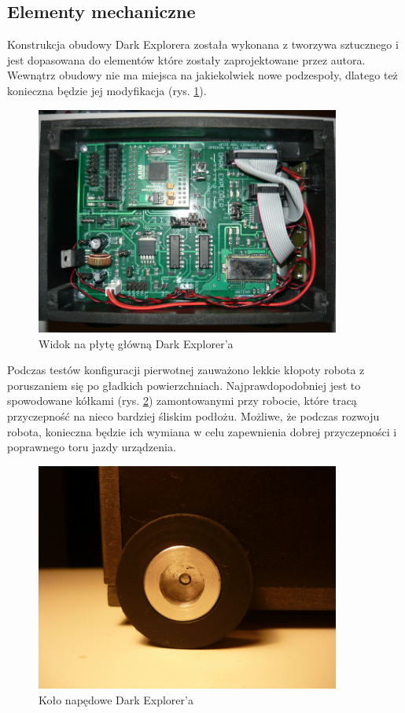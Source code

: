 \subsection{Elementy mechaniczne}
Konstrukcja obudowy Dark Explorera została wykonana z tworzywa sztucznego i jest
dopasowana do elementów które zostały zaprojektowane przez autora. Wewnątrz
obudowy nie ma miejsca na jakiekolwiek nowe podzespoły, dlatego też konieczna
będzie jej modyfikacja (rys. \ref{fig:KmakMainBoard}).

\begin{figure}[!ht]
 \centering
 \includegraphics[height=75mm]{../images/ch02/main_board.jpg}
 \caption{Widok na płytę główną Dark Explorer'a}
 \label{fig:KmakMainBoard}
\end{figure}

Podczas testów konfiguracji pierwotnej zauważono lekkie kłopoty robota z
poruszaniem się po gładkich powierzchniach. Najprawdopodobniej jest to
spowodowane kółkami (rys. \ref{fig:KmakWheel}) zamontowanymi przy robocie, które
tracą przyczepność na nieco bardziej śliskim podłożu. Możliwe, że podczas rozwoju
robota, konieczna będzie ich wymiana w celu zapewnienia dobrej przyczepności i
poprawnego toru jazdy urządzenia.

\begin{figure}[!ht]
 \centering
 \includegraphics[height=75mm]{../images/ch02/wheel.jpg}
 \caption{Koło napędowe Dark Explorer'a}
 \label{fig:KmakWheel}
\end{figure}
